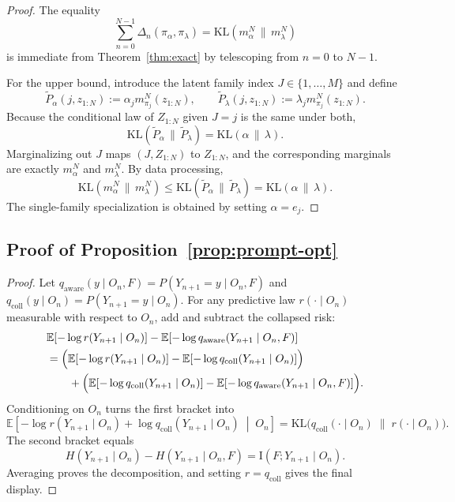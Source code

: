 \documentclass{article}
\theoremstyle{definition}
\theoremstyle{remark}
\newcommand{\E}{\mathbb{E}}
\newcommand{\KL}{\mathrm{KL}}
\newcommand{\I}{\mathrm{I}}
\begin{document}
\begin{proof}
The equality
\[
\sum_{n=0}^{N-1}\Delta_n(\pi_\alpha,\pi_\lambda)
=
\KL(m_\alpha^N\,\|\,m_\lambda^N)
\]
is immediate from Theorem~\ref{thm:exact} by telescoping from $n=0$ to $N-1$.

For the upper bound, introduce the latent family index $J\in\{1,\dots,M\}$ and define
\[
\widetilde P_\alpha(j,z_{1:N}) := \alpha_j m_{\pi_j}^N(z_{1:N}),
\qquad
\widetilde P_\lambda(j,z_{1:N}) := \lambda_j m_{\pi_j}^N(z_{1:N}).
\]
Because the conditional law of $Z_{1:N}$ given $J=j$ is the same under both,
\[
\KL(\widetilde P_\alpha\,\|\,\widetilde P_\lambda)
=
\KL(\alpha\,\|\,\lambda).
\]
Marginalizing out $J$ maps $(J,Z_{1:N})$ to $Z_{1:N}$, and the corresponding marginals are exactly $m_\alpha^N$ and $m_\lambda^N$. By data processing,
\[
\KL(m_\alpha^N\,\|\,m_\lambda^N)
\le
\KL(\widetilde P_\alpha\,\|\,\widetilde P_\lambda)
=
\KL(\alpha\,\|\,\lambda).
\]
The single-family specialization is obtained by setting $\alpha=e_j$.
\end{proof}

\subsection{Proof of Proposition~\ref{prop:prompt-opt}}

\begin{proof}
Let $q_{\mathrm{aware}}(y\mid O_n,F)=P(Y_{n+1}=y\mid O_n,F)$ and
$q_{\mathrm{coll}}(y\mid O_n)=P(Y_{n+1}=y\mid O_n)$. For any predictive law $r(\cdot\mid O_n)$ measurable with respect to $O_n$, add and subtract the collapsed risk:
\begin{align*}
&\E[-\log r(Y_{n+1}\mid O_n)]
-\E[-\log q_{\mathrm{aware}}(Y_{n+1}\mid O_n,F)] \\
&=
\Bigl(
\E[-\log r(Y_{n+1}\mid O_n)]
-\E[-\log q_{\mathrm{coll}}(Y_{n+1}\mid O_n)]
\Bigr) \\
&\qquad +
\Bigl(
\E[-\log q_{\mathrm{coll}}(Y_{n+1}\mid O_n)]
-\E[-\log q_{\mathrm{aware}}(Y_{n+1}\mid O_n,F)]
\Bigr).
\end{align*}
Conditioning on $O_n$ turns the first bracket into
\[
\E\!\left[
-\log r(Y_{n+1}\mid O_n)
+\log q_{\mathrm{coll}}(Y_{n+1}\mid O_n)
\;\middle|\;
O_n
\right]
=
\KL\bigl(
q_{\mathrm{coll}}(\cdot\mid O_n)
\;\|\;
r(\cdot\mid O_n)
\bigr).
\]
The second bracket equals
\[
H(Y_{n+1}\mid O_n)-H(Y_{n+1}\mid O_n,F)
=
\I(F;Y_{n+1}\mid O_n).
\]
Averaging proves the decomposition, and setting $r=q_{\mathrm{coll}}$ gives the final display.
\end{proof}
\end{document}
